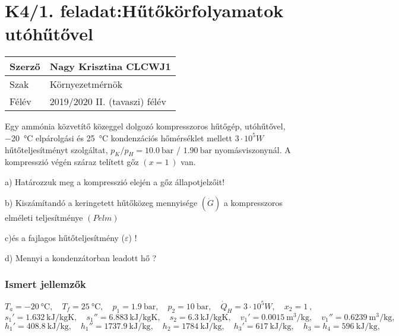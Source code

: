 


\section*{K4/1. feladat:Hűtőkörfolyamatok utóhűtővel}

\begin{tabular}{ | p{2cm} | p{14cm} | } 
	\hline
	Szerző & Nagy Krisztina CLCWJ1 \\ 
	\hline
	Szak & Környezetmérnök \\ 
	\hline
	Félév & 2019/2020 II. (tavaszi) félév \\ 
	\hline
\end{tabular}
\vspace{0.5cm}

\noindent Egy ammónia közvetítő közeggel dolgozó kompresszoros hűtőgép, utóhűtővel, \SI{-20}{\celsius} elpárolgási és \SI{25}{\celsius} kondenzációs hőmérséklet mellett $3\cdot10^5 W$ hűtőteljesítményt szolgáltat, $p_K/p_H = \SI{10,0}{\bar}$ /  $\SI{1,90}{\bar}$ nyomásviszonynál. A kompresszió végén száraz telített gőz  $(x=\SI{1}{}) $ van.

\vspace{2mm}

a) Határozzuk meg a kompresszió elején a gőz állapotjelzőit!

b) Kiszámítandó a keringetett hűtőközeg mennyisége $(\dot{G})$ a kompresszoros elméleti teljesítménye $(Pelm)$

c)és a fajlagos hűtőteljesítmény ($\varepsilon$) !

d) Mennyi a kondenzátorban leadott hő ?

\subsubsection{Ismert jellemzők}
\begin{equation*}
	T_a = \SI{-20}{\celsius},
	\quad
	T_f = \SI{+25}{\celsius},
	\quad
	p_1 = \SI{1,9}{\bar},
	\quad
	p_2 = \SI{10}{\bar},
	\quad
	\dot{Q}_H = 3\cdot10^5 W,
	\quad
	x_2 = \SI{1}{},
\end{equation*}
\begin{equation*}
	s_1' = \SI{1,632}{\kilo\joule\per\kilogram\kelvin},
	\quad
	s_1'' = \SI{6,883}{\kilo\joule\per\kilogram\kelvin},
	\quad
	s_2 = \SI{6,3}{\kilo\joule\per\kilogram\kelvin},
	\quad
	v_1' = \SI{0,0015}{\meter\cubed\per\kilogram},
	\quad
	v_1'' = \SI{0,6239}{\meter\cubed\per\kilogram},
\end{equation*}
\begin{equation*}
	h_1' = \SI{408,8}{\kilo\joule\per\kilogram},
    \quad
    h_1'' = \SI{1737,9}{\kilo\joule\per\kilogram},
    \quad
	h_2 = \SI{1784}{\kilo\joule\per\kilogram},
    \quad
    h_3' = \SI{617}{\kilo\joule\per\kilogram},
    \quad
    h_3 = h_4 = \SI{596}{\kilo\joule\per\kilogram},
\end{equation*}

